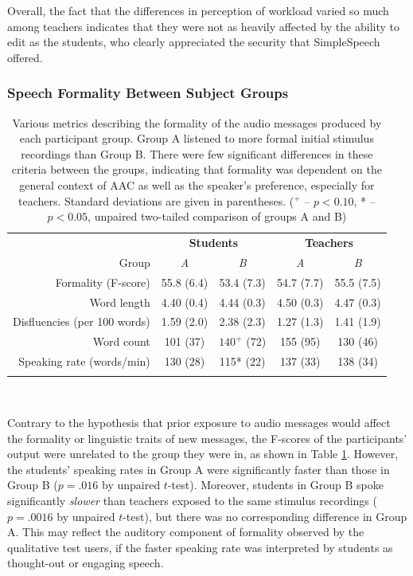 Overall, the fact that the differences in perception of workload varied so much among teachers indicates that they were not as heavily affected by the ability to edit as the students, who clearly appreciated the security that SimpleSpeech offered.

\subsubsection{Speech Formality Between Subject Groups}
\begin{table}
	\centering
	\begin{tabular}{r c c c c}
		\toprule
		& \multicolumn{2}{c}{\textbf{Students}} & \multicolumn{2}{c}{\textbf{Teachers}} \\
		Group                        & \textit{A} & \textit{B}  & \textit{A} & \textit{B} \\
		Formality (F-score)          & 55.8 (6.4)   & 53.4 (7.3)         & 54.7 (7.7)   & 55.5 (7.5)\\
		Word length                  & 4.40 (0.4)   & 4.44 (0.3)           & 4.50 (0.3)    & 4.47 (0.3)\\
		Disfluencies (per 100 words) & 1.59 (2.0)    & 2.38 (2.3)          & 1.27 (1.3)    & 1.41 (1.9)\\
		Word count                   & 101 (37)  & $140^+$ (72)      & 155 (95)  & 130 (46)\\
		Speaking rate (words/min)    & 130 (28)  & 115* (22)      & 137 (33)  & 138 (34)\\
		\bottomrule \\
	\end{tabular}
	\caption{Various metrics describing the formality of the audio messages produced by each participant group. Group A listened to more formal initial stimulus recordings than Group B. There were few significant differences in these criteria between the groups, indicating that formality was dependent on the general context of AAC as well as the speaker's preference, especially for teachers. Standard deviations are given in parentheses. ($^+$ -- $p<0.10$, * -- $p<0.05$, unpaired two-tailed comparison of groups A and B)}~\label{tab:formality}
\end{table}

Contrary to the hypothesis that prior exposure to audio messages would affect the formality or linguistic traits of new messages, the F-scores of the participants' output were unrelated to the group they were in, as shown in Table \ref{tab:formality}.
However, the students' speaking rates in Group A were significantly faster than those in Group B ($p=.016$ by unpaired $t$-test).
Moreover, students in Group B spoke significantly \textit{slower} than teachers exposed to the same stimulus recordings ($p=.0016$ by unpaired $t$-test), but there was no corresponding difference in Group A.
This may reflect the auditory component of formality observed by the qualitative test users, if the faster speaking rate was interpreted by students as thought-out or engaging speech.

